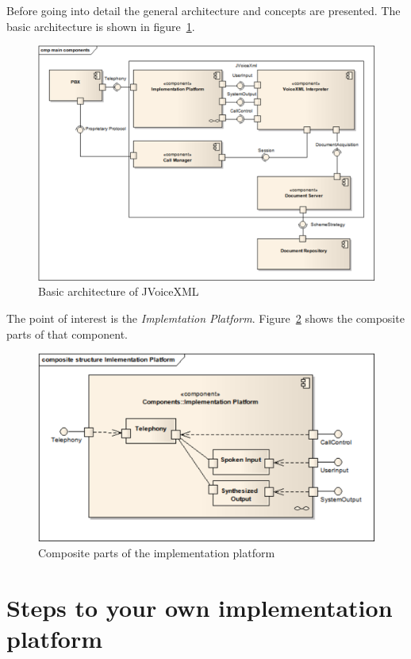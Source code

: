 \documentclass[11pt,a4paper]{article}
\begin{document}
Before going into detail the general architecture and concepts are presented.
The basic architecture is shown in figure~\ref{fig:main-components}.
\begin{figure}
\includegraphics[width=\linewidth]{cd-main-components}
\caption{Basic architecture of JVoiceXML}
\label{fig:main-components}
\end{figure}
The point of interest is the \emph{Implemtation Platform}.
Figure~\ref{fig:implementationplatform} shows the composite parts of that
component.
\begin{figure}
\includegraphics[width=\linewidth]{csd-implementation-platform}
\caption{Composite parts of the implementation platform}
\label{fig:implementationplatform}
\end{figure}

\section{Steps to your own implementation platform}
\end{document}
